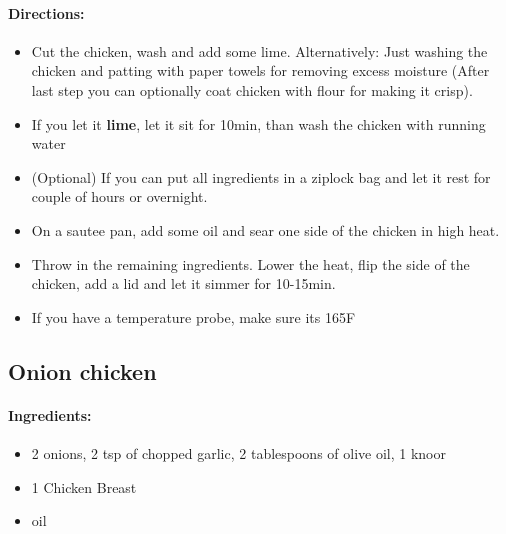 \documentclass{article}
\begin{document}
\paragraph{Directions:}
\begin{itemize}
    \item Cut the chicken, wash and add some lime. Alternatively: Just washing the chicken and patting with paper towels for removing excess moisture (After last step you can optionally coat chicken with flour for making it crisp).
    \item If you let it \textbf{lime}, let it sit for 10min, than wash the chicken with running water
    \item (Optional) If you can put all ingredients in a ziplock bag and let it rest for couple of hours or overnight.
    \item On a sautee pan, add some oil and sear one side of the chicken in high heat.
    \item Throw in the remaining ingredients. Lower the heat, flip the side of the chicken, add a lid and let it simmer for 10-15min.
    \item If you have a temperature probe, make sure its 165F
\end{itemize}

\subsection{Onion chicken}

\paragraph{Ingredients:}
\begin{itemize}
    \item 2 onions, 2 tsp of chopped garlic, 2 tablespoons of olive oil, 1 knoor
    \item 1 Chicken Breast
    \item oil
\end{itemize}
\end{document}
